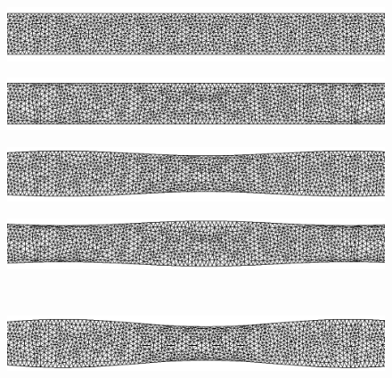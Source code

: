 \begin{figure}[H]
     \begin{minipage}{.50\linewidth}
      \centering
      \includegraphics[scale=0.16]{./02_chaps/cap_validation/figure/comp0.png}\\
     \end{minipage}%
     \begin{minipage}{.50\linewidth}
      \centering
      \includegraphics[scale=0.16]{./02_chaps/cap_validation/figure/ext0.png}\\
     \end{minipage}
     \begin{minipage}{.50\linewidth}
     \medskip
      \centering
      \includegraphics[scale=0.16]{./02_chaps/cap_validation/figure/comp1.png}\\
     \end{minipage}%
     \begin{minipage}{.50\linewidth}
     \medskip
      \centering
      \includegraphics[scale=0.16]{./02_chaps/cap_validation/figure/ext1.png}\\
     \end{minipage}\\[7pt]
     \begin{minipage}{.50\linewidth}
      \centering
      \includegraphics[scale=0.16]{./02_chaps/cap_validation/figure/comp2.png}\\

\end{minipage}
\end{figure}
